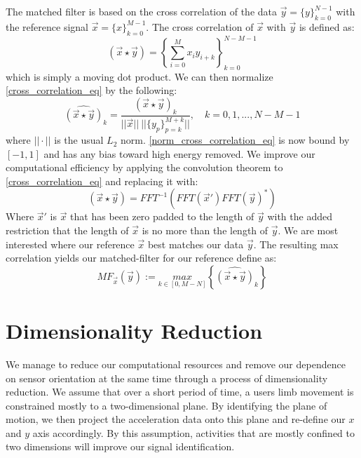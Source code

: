 \documentclass[journal]{IEEEtran}
\begin{document}
The matched filter is based on the cross correlation of the data $\vec{y} = \{y\}_{k=0}^{N-1}$ with the reference signal $\vec{x} = \{x\}_{k=0}^{M-1}$.
The cross correlation of $\vec{x}$ with $\vec{y}$ is defined as:
%
\begin{equation} \label{cross_correlation_eq}
(\vec{x} \star \vec{y}) = \left \{\sum_{i=0}^{M}x_{i} y_{i+k} \right \}_{k=0}^{N-M-1}
\end{equation}
%
which is simply a moving dot product.
We can then normalize \eqref{cross_correlation_eq} by the following:
%
\begin{equation} \label{norm_cross_correlation_eq}
\widehat{(\vec{x} \star \vec{y})}_k = \frac{(\vec{x} \star \vec{y})_k}{||\vec{x}|| \ || \{y_p\}_{p=k}^{M+k} || }, \quad k = 0,1,...,N-M-1
\end{equation}
%
where $|| \cdot ||$ is the usual $L_2$ norm. \eqref{norm_cross_correlation_eq} is now bound by $[-1,1]$ and has any bias toward high energy removed.
We improve our computational efficiency by applying the convolution theorem to \eqref{cross_correlation_eq} and replacing it with:
%
\begin{equation} \label{conv_theorem}
(\vec{x} \star \vec{y}) = FFT^{-1}(FFT(\vec{x}') FFT(\vec{y})^*)
\end{equation}
%
Where $\vec{x}'$ is $\vec{x}$ that has been zero padded to the length of $\vec{y}$ with the added restriction that the length of $\vec{x}$ is no more than the length of $\vec{y}$.
We are most interested where our reference $\vec{x}$ best matches our data $\vec{y}$.
The resulting max correlation yields our matched-filter for our reference define as:
%
\begin{equation} \label{matched_filter_eq}
MF_{\vec{x}}(\vec{y}) := \underset{k \in [0, M-N]}{max} \left \{\widehat{(\vec{x} \star \vec{y})}_k \right \}
\end{equation}
%
\section{Dimensionality Reduction}
We manage to reduce our computational resources and remove our dependence on sensor orientation at the same time through a process of dimensionality reduction.
We assume that over a short period of time, a user\textquotesingle s limb movement is constrained mostly to a two-dimensional plane.
By identifying the plane of motion, we then project the acceleration data onto this plane and re-define our $x$ and $y$ axis accordingly.
By this assumption, activities that are mostly confined to two dimensions will improve our signal identification.
\end{document}
